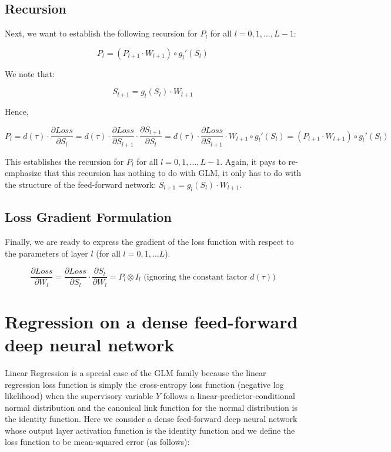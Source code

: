 \documentclass[10pt]{amsart}
\begin{document}
\subsection{Recursion}

Next, we want to establish the following recursion for $P_l$ for all $l = 0, 1, \ldots, L - 1$:

$$P_l = (P_{l+1} \cdot W_{l+1}) \circ g_l'(S_l)$$

We note that: 

$$S_{l+1}= g_l(S_l) \cdot W_{l+1}$$

Hence,

$$P_l = d(\tau) \cdot \frac {\partial Loss} {\partial S_l} = d(\tau) \cdot \frac {\partial Loss} {\partial S_{l+1}}  \cdot \frac {\partial S_{l+1}} {\partial S_l} = d(\tau) \cdot \frac {\partial Loss} {\partial S_{l+1}} \cdot W_{l+1} \circ g_l'(S_l) =  (P_{l+1} \cdot W_{l+1}) \circ g_l'(S_l)$$

This establishes the recursion for $P_l$ for all $l = 0, 1, \ldots, L - 1$. Again, it pays to re-emphasize that this recursion has nothing to do with GLM, it only has to do with the structure of the feed-forward network: $S_{l+1} = g_l(S_l) \cdot W_{l+1}$.

\subsection{Loss Gradient Formulation}

Finally, we are ready to express the gradient of the loss function with respect to the parameters of layer $l$ (for all $l = 0, 1, \ldots L$).

$$ \frac {\partial Loss} {\partial W_l} = \frac {\partial Loss} {\partial S_l} \cdot \frac {\partial S_l} {\partial W_l} = P_l \otimes I_l \mbox{ (ignoring the constant factor } d(\tau))$$

\section{Regression on a dense feed-forward deep neural network}
Linear Regression is a special case of the GLM family because the linear regression loss function is simply the cross-entropy loss function (negative log likelihood) when the supervisory variable $Y$ follows a linear-predictor-conditional normal distribution and the canonical link function for the normal distribution is the identity function. Here we consider a dense feed-forward deep neural network whose output layer activation function is the identity function and we define the loss function to be mean-squared error (as follows):
\end{document}
